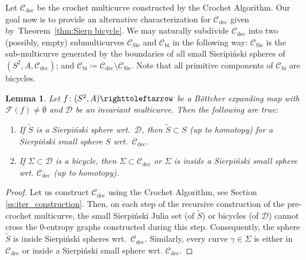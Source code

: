 \documentclass{amsart}
\theoremstyle{plain}
\newtheorem{lemma}[theorem]{Lemma}
\theoremstyle{definition}
\theoremstyle{remark}
\newcommand{\reminder}[1]{\textsl{$\lhd\rhd$#1$\lhd\rhd$}\marginpar{$\lhd\rhd\lhd\rhd\lhd\rhd$}}%
\newcommand{\hide}[1]{}
\newcommand{\Fat}{{\mathcal F}}
\newcommand{\CC}{{\mathcal C}}
\newcommand{\DD}{{\mathcal D}}
\newcommand{\bi}{{\operatorname{bi}}}
\newcommand\selfmap{\righttoleftarrow}
\newcommand{\cro}{{\operatorname{dec}}}
\newcommand{\Sie}{{\operatorname{Sie}}}
\begin{document}

Let $\CC_\cro$ be the crochet multicurve constructed by the Crochet Algorithm. Our goal now is to provide an alternative characterization for $\CC_\cro$ given by~Theorem~\ref{thm:Sierp bicycle}. We may naturally subdivide $\CC_\cro$ into two (possibly, empty) submulticurves $\CC_\Sie$ and $\CC_\bi$ in the following way: $\CC_\Sie$ is the sub-multicurve generated by the boundaries of all small Sieripi\'{n}ski spheres of $(S^2,A,\CC_\cro)$; and $\CC_\bi\coloneq\CC_\cro\setminus \CC_\Sie$. Note that all primitive components of $\CC_\bi$ are bicycles.






\begin{lemma}\label{lem: max_sierp_bicycles}
Let $f\colon(S^2,A)\selfmap$ be a B\"ottcher expanding map with $\Fat(f)\not=\emptyset$ and $\DD$ be an invariant multicurve. Then the following are true:
\begin{enumerate}[label=\text{(\roman*)},font=\normalfont,leftmargin=*]
\item If $\widetilde S$ is a Sierpi\'{n}ski sphere wrt.\ $\DD$, then $\widetilde S \subset S$ (up to homotopy) for a Sierpi\'{n}ski small sphere $ S$ wrt.\  $\CC_\cro$. 
\item If $\Sigma\subset \DD$ is a bicycle, then $\Sigma\subset \CC_\cro$ or $\Sigma$ is inside a Sierpi\'{n}ski small sphere wrt. $\CC_\cro$ (up to homotopy).
\end{enumerate}
\end{lemma}


\begin{proof}
Let us construct $\CC_\cro$ using the Crochet Algorithm, see Section \ref{ss:iter_construction}. Then, on each step of the recursive construction of the pre-crochet multicurve, the small Sierpi\'{n}ski Julia set (of $\widetilde S$) or bicycles (of $\DD$) cannot cross the  $0$-entropy graphs constructed during this step.  Consequently, the sphere $\widetilde S$ is inside  Sierpi\'{n}ski spheres wrt.\ $\CC_\cro$. Similarly, every curve $\gamma\in \Sigma$ is either in $\CC_\cro$ or inside a Sierpi\'{n}ski small sphere wrt. $\CC_\cro$.
\end{proof}
\end{document}
